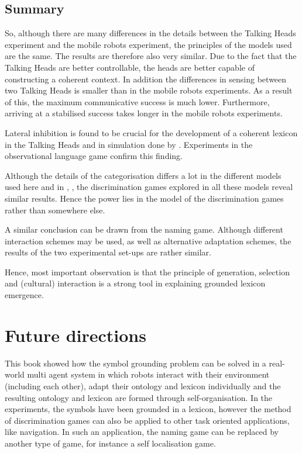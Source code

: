 \subsection{Summary}

So, although there are many differences in the details between the Talking Heads experiment and the mobile robots experiment, the principles of the models used are the same. The results are therefore also very similar. Due to the fact that the Talking Heads are better controllable, the heads are better capable of constructing a coherent context. In addition the differences in sensing between two Talking Heads is smaller than in the mobile robots experiments. As a result of this, the maximum communicative success is much lower. Furthermore, arriving at a stabilised success takes longer in the mobile robots experiments. 

Lateral inhibition is found to be crucial for the development of a coherent lexicon in the Talking Heads \citep{steels:2000,kaplan:2000} and in simulation done by \citet{dejong:2000}. Experiments in the observational language game confirm this finding. 

Although the details of the categorisation differs a lot in the different models used here and in \citet{steels:2000}, \citet{dejong:2000}, the discrimination games explored in all these models reveal similar results. Hence the power lies in the model of the discrimination games rather than somewhere else.

A similar conclusion can be drawn from the naming game. Although different interaction schemes may be used, as well as alternative adaptation schemes, the results of the two experimental set-ups are rather similar. 

Hence, most important observation is that the principle of generation, selection and (cultural) interaction is a strong tool in explaining grounded lexicon emergence.

\section{Future directions}

This book showed how the symbol grounding problem can be solved in a real-world multi agent system in which robots interact with their environment (including each other), adapt their ontology and lexicon individually and the resulting ontology and lexicon are formed through self-organisation. In the experiments, the symbols have been grounded in a lexicon, however the method of discrimination games can also be applied to other task oriented applications, like navigation. In such an application, the naming game can be replaced by another type of game, for instance a {\sc self localisation game}.

